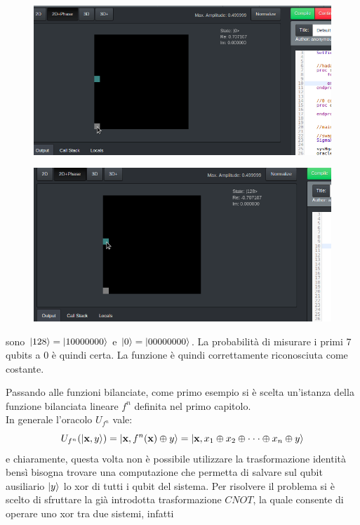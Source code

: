 \documentclass[12pt,a4paper,openright]{report}
\newcommand*\xor{\mathbin{\oplus}}
\begin{document}
\begin{figure}[h]

        \includegraphics[width=.92\textwidth,height=\textheight,keepaspectratio]{constantFunction3}
    
\end{figure}
\begin{figure}[h]

    \includegraphics[width=.92\textwidth,height=\textheight,keepaspectratio]{constantFunction2}
    
\end{figure}

sono $\ket{128}=\ket{10000000}$ e $\ket{0}=\ket{00000000}$. La probabilità di misurare i primi 7 qubits
a 0 è quindi certa. La funzione è quindi correttamente riconosciuta come costante.  \par
Passando alle funzioni bilanciate, come primo esempio si è scelta un'istanza della funzione bilanciata lineare $f^n$ definita nel primo capitolo. \\
In generale l'oracolo $U_{f^n}$ vale:
\[
    U_{f^n}(\ket{\textbf{x},y})= \ket{\textbf{x},f^n(\textbf{x}) \xor y} = \ket{\textbf{x}, x_1 \xor x_2 \xor \cdot\cdot\cdot \xor x_n \xor y}
\] 
e chiaramente, questa volta non è possibile utilizzare la trasformazione identità bensì bisogna trovare una computazione che permetta
di salvare sul qubit ausiliario $\ket{y}$ lo xor di tutti i qubit del sistema. Per risolvere il problema si è scelto di sfruttare
la già introdotta trasformazione $CNOT$, la quale consente di operare uno xor tra due sistemi, infatti 
\end{document}
